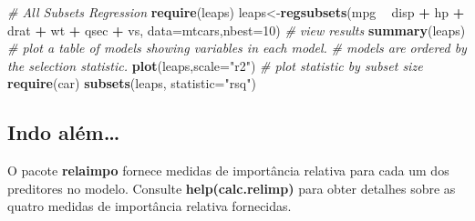 \documentclass[]{article}
\newenvironment{Shaded}{\begin{snugshade}}{\end{snugshade}}
\newcommand{\CommentTok}[1]{\textcolor[rgb]{0.56,0.35,0.01}{\textit{#1}}}
\newcommand{\DataTypeTok}[1]{\textcolor[rgb]{0.13,0.29,0.53}{#1}}
\newcommand{\DecValTok}[1]{\textcolor[rgb]{0.00,0.00,0.81}{#1}}
\newcommand{\KeywordTok}[1]{\textcolor[rgb]{0.13,0.29,0.53}{\textbf{#1}}}
\newcommand{\NormalTok}[1]{#1}
\newcommand{\OperatorTok}[1]{\textcolor[rgb]{0.81,0.36,0.00}{\textbf{#1}}}
\newcommand{\StringTok}[1]{\textcolor[rgb]{0.31,0.60,0.02}{#1}}
\begin{document}
\begin{Shaded}
\begin{Highlighting}[]
\CommentTok{# All Subsets Regression}
\KeywordTok{require}\NormalTok{(leaps)}
\NormalTok{leaps<-}\KeywordTok{regsubsets}\NormalTok{(mpg }\OperatorTok{~}\StringTok{ }\NormalTok{disp }\OperatorTok{+}\StringTok{ }\NormalTok{hp }\OperatorTok{+}\StringTok{ }\NormalTok{drat }\OperatorTok{+}\StringTok{ }\NormalTok{wt }\OperatorTok{+}\StringTok{ }\NormalTok{qsec }\OperatorTok{+}\StringTok{ }\NormalTok{vs, }\DataTypeTok{data=}\NormalTok{mtcars,}\DataTypeTok{nbest=}\DecValTok{10}\NormalTok{)}
\CommentTok{# view results }
\KeywordTok{summary}\NormalTok{(leaps)}
\CommentTok{# plot a table of models showing variables in each model.}
\CommentTok{# models are ordered by the selection statistic.}
\KeywordTok{plot}\NormalTok{(leaps,}\DataTypeTok{scale=}\StringTok{"r2"}\NormalTok{)}
\CommentTok{# plot statistic by subset size }
\KeywordTok{require}\NormalTok{(car)}
\KeywordTok{subsets}\NormalTok{(leaps, }\DataTypeTok{statistic=}\StringTok{"rsq"}\NormalTok{)}
\end{Highlighting}
\end{Shaded}

\hypertarget{indo-aluxe9m}{%
\subsection{Indo além\ldots{}}\label{indo-aluxe9m}}

O pacote \textbf{relaimpo} fornece medidas de importância relativa para
cada um dos preditores no modelo. Consulte \textbf{help(calc.relimp)}
para obter detalhes sobre as quatro medidas de importância relativa
fornecidas.
\end{document}
